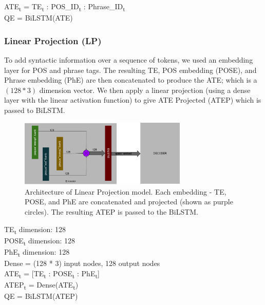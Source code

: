 \documentclass{IEEEtran}
\begin{document}
        \hspace*{-3.5mm}ATE\textsubscript{t} = \lbrack TE\textsubscript{t} : 
        POS\_ID\textsubscript{t} : Phrase\_ID\textsubscript{t}\rbrack \\
        QE = BiLSTM(ATE) \\

        \subsubsection{Linear Projection (LP)}
        To add syntactic information over a sequence of tokens, we used an embedding layer for
        POS and phrase tags. The resulting TE, POS embedding (POSE), and Phrase embedding (PhE) are
        then concatenated to produce the ATE; which is a $ (128 * 3) $ dimension vector. We then
        apply a linear projection (using a dense layer with the linear activation function) to 
        give ATE Projected (ATEP) which is passed to BiLSTM. \\

        \begin{figure}[h]
          \centering
          \includegraphics[width=8cm]{lp.png}
          \caption{Architecture of Linear Projection model. Each embedding - TE, POSE, and PhE 
          are concatenated and projected (shown as purple circles). The resulting ATEP is passed
          to the BiLSTM.}
          \label{fig:lp}
        \end{figure}

        \hspace*{-3.5mm}TE\textsubscript{t} dimension: 128 \\
        POSE\textsubscript{t} dimension: 128 \\
        PhE\textsubscript{t} dimension: 128 \\
        Dense = (128 * 3) input nodes, 128 output nodes \\ 

        \hspace*{-3.5mm}ATE\textsubscript{t} = [TE\textsubscript{t} : 
        POSE\textsubscript{t} : PhE\textsubscript{t}] \\
        ATEP\textsubscript{t} = Dense(ATE\textsubscript{t}) \\
        QE = BiLSTM(ATEP) \\
\end{document}

